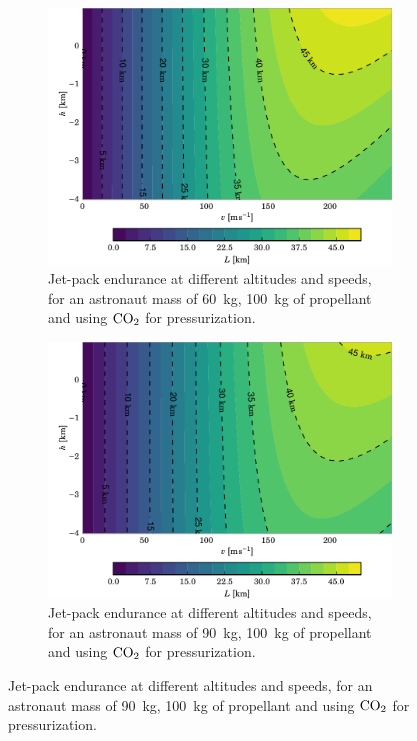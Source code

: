 \documentclass[twocolumn]{article}
\newcommand{\COtwo}{\textnormal{CO}_2}
\begin{document}
\begin{figure}[h!]
  \centering
  \begin{subfigure}{\textwidth}
    \includegraphics{img/l_ma_60}
  \caption{Jet-pack endurance at different altitudes and speeds, for an 
astronaut mass of \SI{60}{\kilogram}, \SI{100}{\kilogram} of propellant
and using $\COtwo$ for pressurization.}
    \label{fig:l_ma_60}
  \end{subfigure}
  \begin{subfigure}{\textwidth}
    \includegraphics{img/l_ma_90}
  \caption{Jet-pack endurance at different altitudes and speeds, for an 
astronaut mass of \SI{90}{\kilogram}, \SI{100}{\kilogram} of propellant
and using $\COtwo$ for pressurization.}
    \label{fig:l_ma_90}
  \end{subfigure}
\end{figure}
\end{document}
